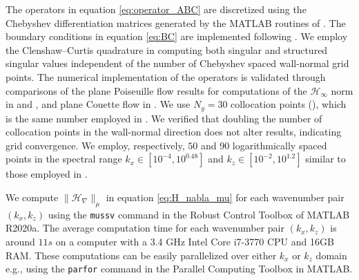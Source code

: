 The operators in equation \eqref{eq:operator_ABC} are discretized using the Chebyshev differentiation matrices generated by the MATLAB routines of \citet{Weideman2000}. The boundary conditions in equation \eqref{eq:BC} are implemented following \citet[chapters 7 and 14]{trefethen2000spectral}. We employ the Clenshaw--Curtis quadrature \citep[chapter 12]{trefethen2000spectral} in computing both singular and structured singular values  independent of the number of Chebyshev spaced wall-normal grid points. The numerical implementation of the operators is validated through comparisons of the plane Poiseuille flow results for computations of the  $\mathcal{H}_\infty$ norm in \citet[chapter 8.1.2]{jovanovic2004modeling} and \citet[figure 5]{schmid2007nonmodal}, and plane Couette flow in \citet[chapter 8.2]{jovanovic2004modeling}. We use $N_y=30$ collocation points (), which is the same number employed in \citet{Jovanovic2005,jovanovic2004modeling}. We verified that doubling the number of collocation points in the wall-normal direction does not alter results, indicating grid convergence. We employ, respectively, $50$ and $90$ logarithmically spaced points in the spectral range $k_x \in [10^{-4},10^{0.48}]$ and $k_z \in [10^{-2},10^{1.2}]$ similar to those employed in \citet{Jovanovic2005}. 



We compute $\|\mathcal{H}_{\nabla}\|_{\mu}$ in equation \eqref{eq:H_nabla_mu} for each wavenumber pair $(k_x,k_z)$ using the \texttt{mussv} command in the Robust Control Toolbox \citep{balas2005robust} of MATLAB R2020a.  The average computation time for each wavenumber pair $(k_x,k_z)$ is around $11s$ on a computer with a 3.4 GHz Intel Core i7-3770 CPU and 16GB RAM. These computations can be easily parallelized over either  $k_x$ or $k_z$ domain  e.g., using the \texttt{parfor} command in the Parallel Computing Toolbox in MATLAB. 

 

\vspace{2mm}

